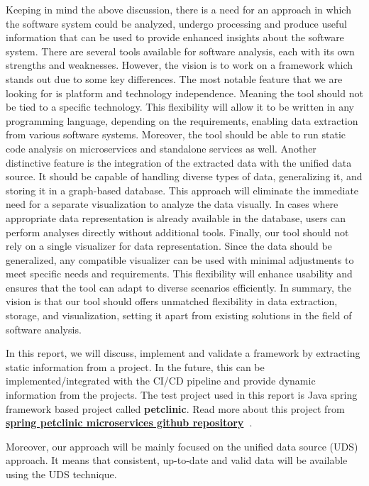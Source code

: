 Keeping in mind the above discussion, there is a need for an approach in which the software system could be analyzed, undergo processing and produce useful information that can be used to provide enhanced insights about the software system. There are several tools available for software analysis, each with its own strengths and weaknesses. However, the vision is to work on a framework which stands out due to some key differences. The most notable feature that we are looking for is platform and technology independence. Meaning the tool should not be tied to a specific technology. This flexibility will allow it to be written in any programming language, depending on the requirements, enabling data extraction from various software systems. Moreover, the tool should be able to run static code analysis on microservices and standalone services as well. Another distinctive feature is the integration of the extracted data with the unified data source. It should be capable of handling diverse types of data, generalizing it, and storing it in a graph-based database. This approach will eliminate the immediate need for a separate visualization to analyze the data visually. In cases where appropriate data representation is already available in the database, users can perform analyses directly without additional tools. Finally, our tool should not rely on a single visualizer for data representation. Since the data should be generalized, any compatible visualizer can be used with minimal adjustments to meet specific needs and requirements. This flexibility will enhance usability and ensures that the tool can adapt to diverse scenarios efficiently. In summary, the vision is that our tool should offers unmatched flexibility in data extraction, storage, and visualization, setting it apart from existing solutions in the field of software analysis.

In this report, we will discuss, implement and validate a framework by extracting static information from a project. In the future, this can be implemented/integrated with the CI/CD pipeline and provide dynamic information from the projects. The test project used in this report is Java spring framework based project called \textbf{petclinic}. Read more about this project from \textbf{\href{https://github.com/spring-petclinic/spring-petclinic-microservices} {spring petclinic microservices github repository}~\citep{spring-petclinic}}.

Moreover, our approach will be mainly focused on the unified data source (UDS) approach. It means that consistent, up-to-date and valid data will be available using the UDS technique. 

